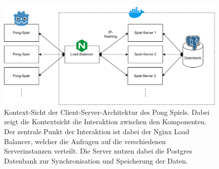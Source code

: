 \documentclass[
]{article}
\begin{document}
\begin{figure}[H]
	\centering
	\includegraphics[width=\textwidth ]{resources/Client-Server.drawio.png}
	\caption{Kontext-Sicht der Client-Server-Architektur des Pong Spiels. Dabei zeigt die Kontextsicht die Interaktion zwischen den Komponenten. Der zentrale Punkt der Interaktion ist dabei der Nginx Load Balancer, welcher die Anfragen auf die verschiedenen Serverinstanzen verteilt.
  Die Server nutzen dabei die Postgres Datenbank zur Synchronisation und Speicherung der Daten.       }
	\label{fig:clientserver}
\end{figure}
\end{document}
